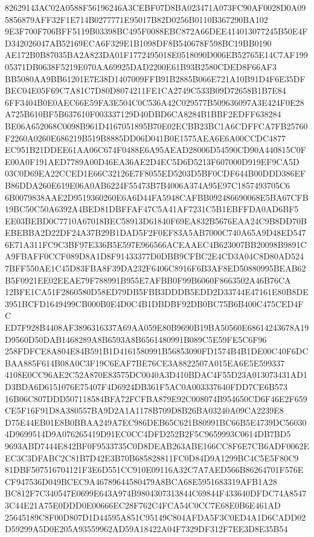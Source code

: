 \documentclass[UTF8,fontset=fandol,zihao=-4,a4paper]{ctexart}
\begin{document}
{{82629143AC02A0588F56196246A3CEBF07D8BA023471A073FC90AF0028D0A095856879AFF32F1E714B0277771E95017B82D0256B0110B367290BA102
9E3F700F706BFF5119B03398BC495F0088EBC872A66DEE414013077245B50E4FD342026047AB52169ECA6F329E1B1098DF8B540678F598BC19BB0190
AE172B0B87035BA2A823DA01F1772495018E0518090D006EB52765E14C7AF19905371DB0638F5219E070AA69925DAD2200E61B93B2580CDED8F66AF3
BB5080AA9BB61201E7E38D1407009FFB91B2885B066E721A10B91D4F6E35DFBEC04E05F69C7A81C7D80D8074211FE1CA2749C533B09D72658B1B7E84
6FF3404B0E0AEC66E59FA3E504C0C536A42C029577B509636097A3E424F0E28A725B610BF5B637610F003337129D40DBD6CA8284B1BBF2EDFF638284
BE06A652068C0098B961D4167051895B70E02ECBB23BC1A6CDFFCA7FB25760F2260A0260E686219B519B8885DD06D041B0E1575AEA6E6A00CCDC4877
EC951B21DDEE61AA06C674F0488E6A95AEAD28006D54590CD90A440815C0FE00A0F191AED7789A00D46EA36AE2D4EC5D6D5213F607000D919EF9CA5D
03C0D69EA22CCED1E66C32126E7F8055ED5203D5BF0CDF644B00DDD386EFB86DDA260E619E06A0AB6224F55473B7B4006A374A95E97C1857493705C6
6B0079838AAE2D9519360260E6A6D44FA5948CAFBB092486690068E5BA67CFB19BC50C50A6392A4BED81DBFFAF47C5A41AF7231C5B1EBFFDA0AD6BF5
EE03BEBD0C7710A67018BEC58913D61840F69EA832B5676EAA24C9B8DD70BEBEBBA2D22DF24A37B29B1DAD5F2F0EF83A5AB7000C740A65A9D48ED547
6E71A311FC9C3BF97E336B5E597E966566ACEAAEC4B623007BB20098B9891CA9FBAFF0CCF089D8A1D8F91433377D0DBB9CFBC2E4CD3A04C8D80AD524
7BFF550AE1C45D83FBA8F39DA232F6406C8916F6B3AF8ED50880995BEAB62B5F0921EE02EEAE79F788991B955E7AFBB0F99B6060F8663502A46B76CA
12BFE1CA51F2860580D58ED79DB5FBB3DDDB5EDD2D33744E47161E80B8DE3951BCFD1649499CB000B0E4D0C4B1DBDBF92DB0BC75B6B400C475CED4FC
ED7F928B4408AF3896316337A69AA059E80B9690B19BA50560E68614243678A19D9560D50DAB1468289A8B6593A8B6561480991B089C5E59FE5C6F96
258FDFCE8A804E84B591B1D4161580991B56853090FD1574B4B1DE00C40F6DCBAA885F614B08A0C3F19C6EAF7BE76CE3A8822507A015EA6E5E599337
4108E0CC96AE2C52A870E83575DC0040A3D410BDAC4F55D23A013073431AD1D3BDA6D6151076E75407F4D6924DB361F5AC0A003337640FDD7CE6B573
16B06C807DDD507118584BFA72FCFBA879E92C008074B954650CD6F46E2F659CE5F16F91D8A380557BA9D2A1A1178B709D8B26BA03240A09CA2239E8
D75E44EB01E8B0BBAA249A7EC986DEB65C621B80991BC66B5E4739DC560304D9699514D9A076265419D91EC0CC4DFD252B2F5C9659993C0614DB7BD5
9693ABD7444E842BF0F9533735C0D8DEAB263ABE166CC8F6E7CB6ADF0062EEC3C3DFABC2C81B7D42E3B70B685828811FC0D84D9A1299BC4C5E5F80C9
81DBF507516704121F3E6D551CC910E09116A32C7A7AED566B86264701F576ECF947536D049BCEC9A46789644580479A8BCA68E5951683319AFB1A28
BC812F7C340547E0699E643A974B9804307313844C69844F433640DFDC74A85473C44E21A75E0DDD0E00666EC28F762C4FCA54C0CC7E68E0B6E461AD
25645189C8F00D807D1D44595A851C95149C804AFDA5F3C0ED4A1D6CADD02D59299A5D0E205A93559962AD59A18422A04F7329DF312F7EE3D8E35B54
}}
\end{document}
